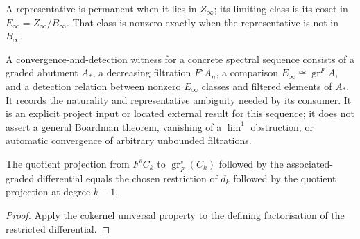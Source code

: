 \begin{definition}
  \label{def:ss-permanent-einfty-class}
  \notready
  A representative is permanent when it lies in $Z_\infty$; its limiting
  class is its coset in $E_\infty=Z_\infty/B_\infty$.  That class is nonzero
  exactly when the representative is not in $B_\infty$.
\end{definition}

\begin{definition}
  \label{def:ss-convergence-detection-witness}
  \notready
  A convergence-and-detection witness for a concrete spectral sequence consists
  of a graded abutment $A_*$, a decreasing filtration $F^sA_n$, a comparison
  $E_\infty\cong\operatorname{gr}^F A$, and a detection relation between
  nonzero $E_\infty$ classes and filtered elements of $A_*$.  It records the
  naturality and representative ambiguity needed by its consumer.  It is an
  explicit project input or located external result for this sequence; it does
  not assert a general Boardman theorem, vanishing of a $\lim^1$ obstruction,
  or automatic convergence of arbitrary unbounded filtrations.
\end{definition}

\begin{lemma}
  \label{lem:filtered-associated-graded-differential-projection}
  \leanok
  The quotient projection from $F^sC_k$ to
  $\operatorname{gr}^s_F(C_k)$ followed by the associated-graded differential
  equals the chosen restriction of $d_k$ followed by the quotient projection at
  degree $k-1$.
\end{lemma}

\begin{proof}
  \leanok
  Apply the cokernel universal property to the defining factorisation of the
  restricted differential.
\end{proof}

